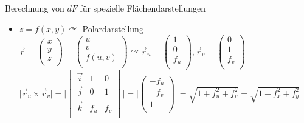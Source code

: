 \documentclass[a4paper]{scrartcl}
\begin{document}
Berechnung von $dF$ für spezielle Flächendarstellungen
\begin{itemize}
\item $z=f(x,y) \curvearrowright$ Polardarstellung $\vec{r} = \begin{pmatrix} x \\y\\z \\ \end{pmatrix} = \begin{pmatrix} u \\ v \\ f(u,v) \\ \end{pmatrix} \curvearrowright \vec{r}_u = \begin{pmatrix} 1 \\ 0 \\ f_u \\ \end{pmatrix}, \vec{r}_v = \begin{pmatrix} 0\\ 1\\ f_v \\ \end{pmatrix}$\\
$\lvert \vec{r}_u \times \vec{r}_v \rvert = \lvert \begin{vmatrix} \vec{i} & 1 & 0\\ \vec{j} & 0 & 1 \\ \vec{k} & f_u & f_v \\ \end{vmatrix} \rvert = \lvert \begin{pmatrix} - f_u \\ - f_v \\ 1 \\ \end{pmatrix} \rvert = \sqrt{1 + f_u^2 + f_v ^2 } = \sqrt{ 1 + f_x^2 + f_y^2}$


\end{itemize}
\end{document}
